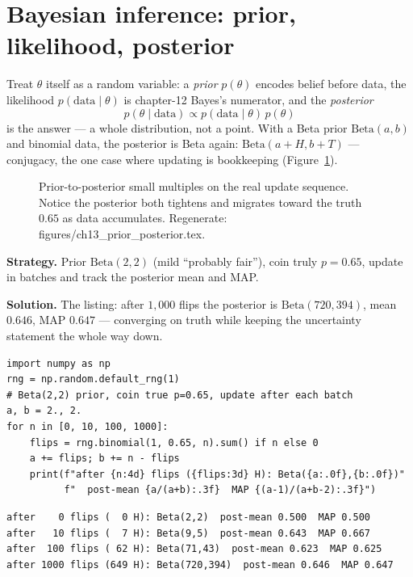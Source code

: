 \section{Bayesian inference: prior, likelihood, posterior}\label{sec:stats-bayes}

Treat $\theta$ itself as a random variable: a \emph{prior}
$p(\theta)$ encodes belief before data, the likelihood $p(\text{data}
\mid\theta)$ is chapter-12 Bayes's numerator, and the
\emph{posterior}
\[
p(\theta\mid\text{data})\propto p(\text{data}\mid\theta)\,p(\theta)
\]
is the answer --- a whole distribution, not a point. With a Beta prior
$\mathrm{Beta}(a,b)$ and binomial data, the posterior is Beta again:
$\mathrm{Beta}(a{+}H,b{+}T)$ --- conjugacy, the
one case where updating is bookkeeping (Figure~\ref{fig:pp}).

\begin{figure}[htbp]
\centering

\caption{Prior-to-posterior small multiples on the real update sequence.
Notice the posterior both tightens and migrates toward the truth $0.65$
as data accumulates. Regenerate:
\ttfamily figures/ch13\_prior\_posterior.tex.}
\label{fig:pp}
\end{figure}

\begin{example}\label{ex:betacoin}
\textbf{Strategy.} Prior $\mathrm{Beta}(2,2)$ (mild ``probably fair''),
coin truly $p=0.65$, update in batches and track the posterior mean and
MAP.

\textbf{Solution.} The listing: after $1{,}000$ flips the posterior is
$\mathrm{Beta}(720,394)$, mean $0.646$, MAP $0.647$ --- converging on
truth while keeping the uncertainty statement the whole way down.
\end{example}

\begin{lstlisting}[caption={\ttfamily code/ch13\_beta\_update.py ---
Beta--binomial conjugate updating on a live data stream.}]
import numpy as np
rng = np.random.default_rng(1)
# Beta(2,2) prior, coin true p=0.65, update after each batch
a, b = 2., 2.
for n in [0, 10, 100, 1000]:
    flips = rng.binomial(1, 0.65, n).sum() if n else 0
    a += flips; b += n - flips
    print(f"after {n:4d} flips ({flips:3d} H): Beta({a:.0f},{b:.0f})"
          f"  post-mean {a/(a+b):.3f}  MAP {(a-1)/(a+b-2):.3f}")
\end{lstlisting}

\begin{lstlisting}[caption={Output of the Bayesian update. Notice
posterior mean and MAP converge --- with enough data the disagreement
between point estimates vanishes (Figure~\ref{fig:likpost}).}]
after    0 flips (  0 H): Beta(2,2)  post-mean 0.500  MAP 0.500
after   10 flips (  7 H): Beta(9,5)  post-mean 0.643  MAP 0.667
after  100 flips ( 62 H): Beta(71,43)  post-mean 0.623  MAP 0.625
after 1000 flips (649 H): Beta(720,394)  post-mean 0.646  MAP 0.647
\end{lstlisting}

